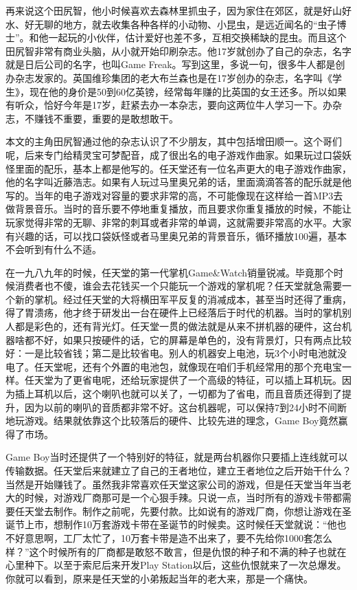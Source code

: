 \documentclass[
  letterpaper,
  DIV=11,
  numbers=noendperiod]{scrreprt}
\begin{document}
再来说这个田尻智，他小时候喜欢去森林里抓虫子，因为家住在郊区，就是好山好水、好无聊的地方，就去收集各种各样的小动物、小昆虫，是远近闻名的``虫子博士''。和他一起玩的小伙伴，估计爱好也差不多，互相交换稀缺的昆虫。而且这个田尻智非常有商业头脑，从小就开始印刷杂志。他17岁就创办了自己的杂志，名字就是日后公司的名字，也叫Game
Freak。写到这里，多说一句，很多牛人都是创办杂志发家的。英国维珍集团的老大布兰森也是在17岁创办的杂志，名字叫《学生》，现在他的身价是50到60亿英镑，经常每年赚的比英国的女王还多。所以如果有听众，恰好今年是17岁，赶紧去办一本杂志，要向这两位牛人学习一下。办杂志，不赚钱不重要，重要的是敢想敢干。

本文的主角田尻智通过他的杂志认识了不少朋友，其中包括增田顺一。这个哥们呢，后来专门给精灵宝可梦配音，成了很出名的电子游戏作曲家。如果玩过口袋妖怪里面的配乐，基本上都是他写的。任天堂还有一位名声更大的电子游戏作曲家，他的名字叫近藤浩志。如果有人玩过马里奥兄弟的话，里面滴滴答答的配乐就是他写的。当年的电子游戏对容量的要求非常的高，不可能像现在这样给一首MP3去做背景音乐。当时的音乐要不停地重复播放，而且要求你重复播放的时候，不能让玩家觉得非常的无聊、非常的刺耳或者非常的单调，这就需要非常高的水平。大家有兴趣的话，可以找口袋妖怪或者马里奥兄弟的背景音乐，循环播放100遍，基本不会听到有什么不适。

在一九八九年的时候，任天堂的第一代掌机Game\&Watch销量锐减。毕竟那个时候消费者也不傻，谁会去花钱买一个只能玩一个游戏的掌机呢？任天堂就急需要一个新的掌机。经过任天堂的大将横田军平反复的消减成本，甚至当时还得了重病，得了胃溃疡，他才终于研发出一台在硬件上已经落后于时代的机器。当时的掌机别人都是彩色的，还有背光灯。任天堂一贯的做法就是从来不拼机器的硬件，这台机器啥都不好，如果只按硬件的话，它的屏幕是单色的，没有背景灯，只有两点比较好：一是比较省钱；第二是比较省电。别人的机器安上电池，玩3个小时电池就没电了。任天堂呢，还有个外置的电池包，就像现在咱们手机经常用的那个充电宝一样。任天堂为了更省电呢，还给玩家提供了一个高级的特征，可以插上耳机玩。因为插上耳机以后，这个喇叭也就可以关了，一切都为了省电，而且音质还得到了提升，因为以前的喇叭的音质都非常不好。这台机器呢，可以保持7到24小时不间断地玩游戏。结果就依靠这个比较落后的硬件、比较先进的理念，Game
Boy竟然赢得了市场。

Game
Boy当时还提供了一个特别好的特征，就是两台机器你只要插上连线就可以传输数据。任天堂后来就建立了自己的王者地位，建立王者地位之后开始干什么？当然是开始赚钱了。虽然我非常喜欢任天堂这家公司的游戏，但是任天堂当年当老大的时候，对游戏厂商那可是一个心狠手辣。只说一点，当时所有的游戏卡带都需要任天堂去制作。制作之前呢，先要付款。比如说有的游戏厂商，你想让游戏在圣诞节上市，想制作10万套游戏卡带在圣诞节的时候卖。这时候任天堂就说：``他也不好意思啊，工厂太忙了，10万套卡带是造不出来了，要不先给你1000套怎么样？''这个时候所有的厂商都是敢怒不敢言，但是仇恨的种子和不满的种子也就在心里种下。以至于索尼后来开发Play
Station以后，这些仇恨就来了一次总爆发。你就可以看到，原来是任天堂的小弟叛起当年的老大来，那是一个痛快。
\end{document}
